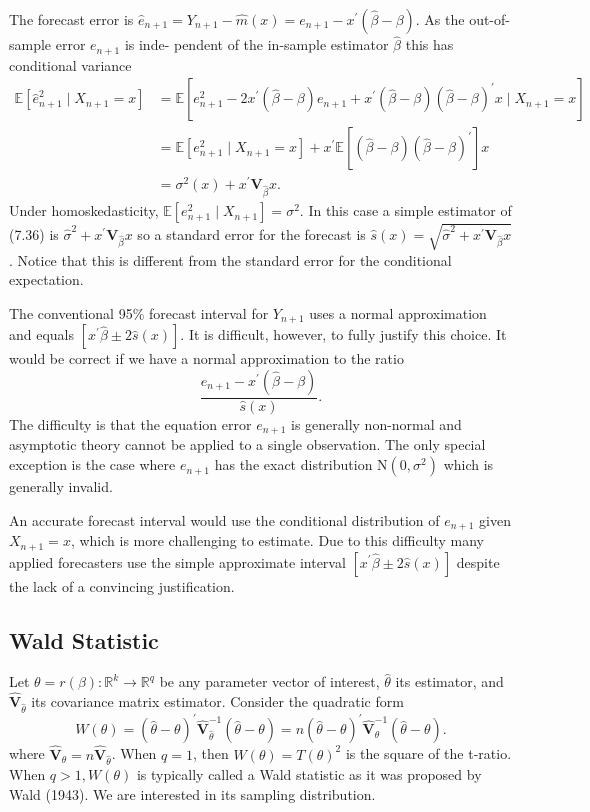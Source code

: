 \documentclass[10pt]{article}
\begin{document}
The forecast error is $\widehat{e}_{n+1}=Y_{n+1}-\widehat{m}(x)=e_{n+1}-x^{\prime}(\widehat{\beta}-\beta)$. As the out-of-sample error $e_{n+1}$ is inde- pendent of the in-sample estimator $\widehat{\beta}$ this has conditional variance
$$
\begin{aligned}
\mathbb{E}\left[\widehat{e}_{n+1}^{2} \mid X_{n+1}=x\right] &=\mathbb{E}\left[e_{n+1}^{2}-2 x^{\prime}(\widehat{\beta}-\beta) e_{n+1}+x^{\prime}(\widehat{\beta}-\beta)(\widehat{\beta}-\beta)^{\prime} x \mid X_{n+1}=x\right] \\
&=\mathbb{E}\left[e_{n+1}^{2} \mid X_{n+1}=x\right]+x^{\prime} \mathbb{E}\left[(\widehat{\beta}-\beta)(\widehat{\beta}-\beta)^{\prime}\right] x \\
&=\sigma^{2}(x)+x^{\prime} \boldsymbol{V}_{\widehat{\beta}} x .
\end{aligned}
$$
Under homoskedasticity, $\mathbb{E}\left[e_{n+1}^{2} \mid X_{n+1}\right]=\sigma^{2}$. In this case a simple estimator of (7.36) is $\widehat{\sigma}^{2}+x^{\prime} \boldsymbol{V}_{\widehat{\beta}} x$ so a standard error for the forecast is $\widehat{s}(x)=\sqrt{\widehat{\sigma}^{2}+x^{\prime} \boldsymbol{V}_{\widehat{\beta}} x}$. Notice that this is different from the standard error for the conditional expectation.

The conventional 95\% forecast interval for $Y_{n+1}$ uses a normal approximation and equals $\left[x^{\prime} \widehat{\beta} \pm 2 \widehat{s}(x)\right]$. It is difficult, however, to fully justify this choice. It would be correct if we have a normal approximation to the ratio
$$
\frac{e_{n+1}-x^{\prime}(\widehat{\beta}-\beta)}{\widehat{s}(x)} .
$$
The difficulty is that the equation error $e_{n+1}$ is generally non-normal and asymptotic theory cannot be applied to a single observation. The only special exception is the case where $e_{n+1}$ has the exact distribution $\mathrm{N}\left(0, \sigma^{2}\right)$ which is generally invalid.

An accurate forecast interval would use the conditional distribution of $e_{n+1}$ given $X_{n+1}=x$, which is more challenging to estimate. Due to this difficulty many applied forecasters use the simple approximate interval $\left[x^{\prime} \widehat{\beta} \pm 2 \widehat{s}(x)\right]$ despite the lack of a convincing justification.

\subsection{Wald Statistic}
Let $\theta=r(\beta): \mathbb{R}^{k} \rightarrow \mathbb{R}^{q}$ be any parameter vector of interest, $\widehat{\theta}$ its estimator, and $\widehat{\boldsymbol{V}}_{\widehat{\theta}}$ its covariance matrix estimator. Consider the quadratic form
$$
W(\theta)=(\widehat{\theta}-\theta)^{\prime} \widehat{\mathbf{V}}_{\widehat{\theta}}^{-1}(\widehat{\theta}-\theta)=n(\widehat{\theta}-\theta)^{\prime} \widehat{\boldsymbol{V}}_{\theta}^{-1}(\widehat{\theta}-\theta) .
$$
where $\widehat{\boldsymbol{V}}_{\theta}=n \widehat{\boldsymbol{V}}_{\widehat{\theta}}$. When $q=1$, then $W(\theta)=T(\theta)^{2}$ is the square of the t-ratio. When $q>1, W(\theta)$ is typically called a Wald statistic as it was proposed by Wald (1943). We are interested in its sampling distribution.
\end{document}
